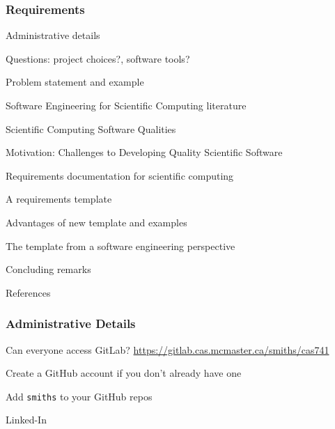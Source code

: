 \documentclass[t,12pt,numbers,fleqn]{beamer}
\begin{document}



\begin{frame}
\frametitle{Requirements}

\bi
\item Administrative details
\item Questions: project choices?, software tools?
\item Problem statement and example
\item Software Engineering for Scientific Computing literature
\item Scientific Computing Software Qualities
\item Motivation: Challenges to Developing Quality Scientific Software
\item Requirements documentation for scientific computing
\item A requirements template
\item Advantages of new template and examples
\item The template from a software engineering perspective
\item Concluding remarks
\item References
\ei
\end{frame}


\begin{frame}
\frametitle{Administrative Details}

\bi
\item Can everyone access GitLab?
  \href{https://gitlab.cas.mcmaster.ca/smiths/cas741}{https://gitlab.cas.mcmaster.ca/smiths/cas741}
\item Create a GitHub account if you don't already have one
\item Add \texttt{smiths} to your GitHub repos
\item Linked-In
\item {}
\ei

\end{frame}

\end{document}
